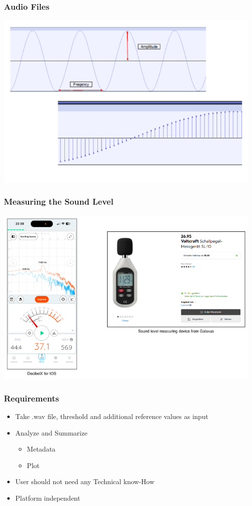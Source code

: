 \begin{frame}
    \frametitle{Audio Files}
    \centering
    \includegraphics[width=0.8\linewidth]{../assets/audiofile_description.png}
\end{frame}

\begin{frame}
    \frametitle{Measuring the Sound Level}
    \centering
    \includegraphics[width=0.6\linewidth]{../assets/measure_sound_level.png}
\end{frame}

\begin{frame}
    \frametitle{Requirements}
    \begin{itemize}[<+->]
        \large
        \item Take .wav file, threshold and additional reference values as input
        \item Analyze and Summarize 
        \begin{itemize}
            \large
            \item Metadata
            \item Plot
        \end{itemize}
        \item User should not need any Technical know-How
        \item Platform independent
    \end{itemize}
\end{frame}

